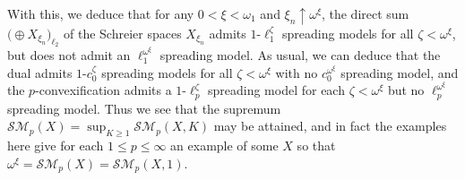\documentclass[12pt]{amsart}
\theoremstyle{definition}
\newcommand{\ssm}{\mathcal{SM}}
\begin{document}
With this, we deduce that for any $0<\xi<\omega_1$ and $\xi_n\uparrow \omega^\xi$, the direct sum $\bigl(\oplus X_{\xi_n}\bigr)_{\ell_2}$ of the Schreier spaces $X_{\xi_n}$ admits $1$-$\ell_1^\zeta$ spreading models for all $\zeta<\omega^\xi$, but does not admit an $\ell_1^{\omega^\xi}$ spreading model.  As usual, we can deduce that the dual admits $1$-$c_0^\zeta$ spreading models for all $\zeta<\omega^\xi$ with no $c_0^{\omega^\xi}$ spreading model, and the $p$-convexification admits a $1$-$\ell_p^\zeta$ spreading model for each $\zeta<\omega^\xi$ but no $\ell_p^{\omega^\xi}$ spreading model.  Thus we see that the supremum $\ssm_p(X)=\sup_{K\geqslant 1}\ssm_p(X, K)$ may be attained, and in fact the examples here give for each $1\leqslant p\leqslant \infty$ an example of some $X$ so that $\omega^\xi = \ssm_p(X)=\ssm_p(X, 1)$.  
\end{document}

